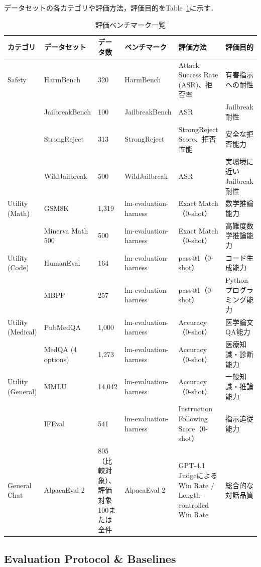 データセットの各カテゴリや評価方法，評価目的をTable~\ref{tab:benchmark}に示す．
\begin{table}[htbp]
\centering
\caption{評価ベンチマーク一覧}
\label{tab:benchmark}
\small
\begin{tabularx}{\textwidth}{p{1.5cm}p{2.3cm}p{1.3cm}p{2.3cm}Xp{2.8cm}}
\toprule
\textbf{カテゴリ} & \textbf{データセット} & \textbf{データ数} & \textbf{ベンチマーク} & \textbf{評価方法} & \textbf{評価目的} \\
\midrule

Safety
& HarmBench & 320 & HarmBench & Attack Success Rate (ASR)、拒否率 & 有害指示への耐性 \\
& JailbreakBench & 100 & JailbreakBench & ASR & Jailbreak耐性 \\ 
& StrongReject & 313 & StrongReject & StrongReject Score、拒否性能 & 安全な拒否能力 \\
& WildJailbreak & 500 & WildJailbreak & ASR & 実環境に近いJailbreak耐性 \\
\midrule
Utility (Math)
& GSM8K & 1,319 & lm-evaluation-harness & Exact Match（0-shot） & 数学推論能力 \\
& Minerva Math 500 & 500 & lm-evaluation-harness & Exact Match（0-shot） & 高難度数学推論能力 \\
\midrule
Utility (Code)
& HumanEval & 164 & lm-evaluation-harness & pass@1（0-shot） & コード生成能力 \\
& MBPP & 257 & lm-evaluation-harness & pass@1（0-shot） & Pythonプログラミング能力 \\
\midrule
Utility (Medical)
& PubMedQA & 1,000 & lm-evaluation-harness & Accuracy（0-shot） & 医学論文QA能力 \\
& MedQA (4 options) & 1,273 & lm-evaluation-harness & Accuracy（0-shot） & 医療知識・診断能力 \\
\midrule
Utility (General)
& MMLU & 14,042 & lm-evaluation-harness & Accuracy（0-shot） & 一般知識・推論能力 \\
& IFEval & 541 & lm-evaluation-harness & Instruction Following Score（0-shot） & 指示追従能力 \\
\midrule
General Chat
& AlpacaEval 2 & 805（比較対象）、評価対象100または全件 & AlpacaEval 2 & GPT-4.1 Judgeによる Win Rate / Length-controlled Win Rate & 総合的な対話品質 \\
\bottomrule
\end{tabularx}
\end{table}

\subsection{Evaluation Protocol \& Baselines}
\label{app:evaluation_protocol}

